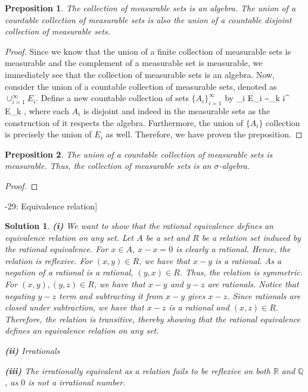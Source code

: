 \documentclass{article} %
\def\eQb#1\eQe{\begin{eqnarray*}#1\end{eqnarray*}}
\def\Qb#1\Qe{\begin{question}#1\end{question}}
\theoremstyle{quest}
\newtheorem*{question}{Question}
\newtheorem*{preposition}{Preposition}
\newtheorem*{solution}{Solution}
\begin{document}
\begin{preposition}
The collection of measurable sets is an algebra. The union of a countable collection of measurable sets
is also the union of a countable disjoint collection of measurable sets. 
\end{preposition}
\begin{proof} Since we know that the union of a finite collection of measurable sets is measurable 
and the complement of a measurable set is measurable, we immediately see that the collection of
measurable sets is an algebra. Now, consider the union of a countable collection of measurable sets,
denoted as $\cup_{i=1}^{\infty}E_i$. Define a new countable collection of sets 
$\{ A_i \}_{i=1}^{\infty} $
by
\eQb
A_i \triangleq E_i \sim \cup_{k \neq i}^{\infty} E_k , 
\eQe
where each $A_i$ is disjoint and 
indeed in the measurable sets as the construction of it respects the algebra.
Furthermore, the union of $\{ A_i \}$ collection is precisely 
the union of $E_i$ as well. Therefore, we have 
proven the preposition.
\end{proof}

\bigskip

\begin{preposition}
The union of a countable collection of measurable sets is measurable. Thus,
the collection of measurable sets is an $\sigma$-algebra.
\end{preposition}
\begin{proof}
\end{proof}

\bigskip

\Qb[2.6-29: Equivalence relation]
\Qe
\begin{solution}
\textbf{(i)} We want to show that the rational equivalence defines an equivalence 
relation on any set. Let $A$ be a set and $R$ be a relation set induced by 
the rational equivalence. For $x \in A$, $x - x = 0$ is clearly a rational.
Hence, the relation is reflexive. For $(x,y) \in R$, we have that $x-y$ is a rational.
As a negation of a rational is a rational, $(y,x) \in R$. Thus, the relation is symmetric.
For $(x,y), (y,z) \in R$, we have that $x-y$ and $y-z$ are rationals. Notice that
negating $y-z$ term and subtracting it from $x-y$ gives $x-z$. Since rationals are closed
under subtraction, we have that $x-z$ is a rational and $(x,z) \in R$. Therefore, the relation
is transitive, thereby showing that the rational equivalence defines an equivalence relation 
on any set. \\

\smallskip

\textbf{(ii)} Irrationals  

\smallskip

\textbf{(iii)} The irrationally equivalent as a relation fails to be reflexive on both 
$\mathbb{R}$ and $\mathbb{Q}$, as $0$ is not a irrational number.

\end{solution}
\end{document}
